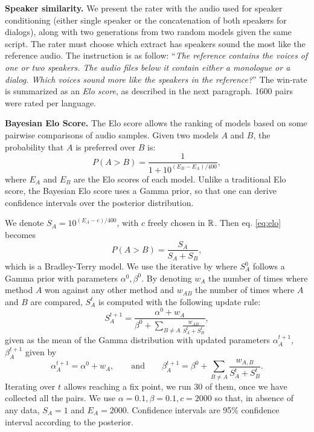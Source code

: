 \textbf{Speaker similarity.}
We present the rater with the audio used for speaker conditioning (either single speaker or the concatenation of both speakers for dialogs), along with two generations from two random models given the same script. The rater must choose which extract has speakers sound the most like the reference audio. The instruction is as follow:
``\emph{The reference contains the voices of one or two speakers. The audio files below it contain either a monologue or a dialog. Which voices sound more like the speakers in the reference?}''
The win-rate is summarized as an \emph{Elo score}, as described in the next paragraph. 1600 pairs were rated per language.

\textbf{Bayesian Elo Score.}
The Elo score allows the ranking of models based on some pairwise comparisons of audio samples. Given two models $A$ and $B$, the probability that $A$ is preferred over $B$ is:
\begin{equation}
    P(A>B) = \frac{1}{1 +10^{(E_B-E_A)/400}},
    \label{eq:elo}
\end{equation}
where $E_A$ and $E_B$ are the Elo scores of each model. 
Unlike a traditional Elo score, the Bayesian Elo score uses a Gamma prior,
so that one can derive confidence intervals over the posterior distribution.


We denote $S_A = 10^{(E_A - c)/400}$, with $c$ freely chosen in $\mathbb{R}$. Then eq. \eqref{eq:elo} becomes
\begin{equation}
    P(A>B) = \frac{S_A}{S_A+S_B},
\end{equation}
which is a Bradley-Terry \citep{bradley_terry} model. We use the iterative by \citet{carondoucet} where $S_A^0$ follows a Gamma prior with parameters $\alpha^0, \beta^0$. 
By denoting $w_A$ the number of times where method $A$ won against any other method and $w_{AB}$ the number of times where $A$ and $B$ are compared, $S_A^t$ is computed with the following update rule:
\begin{equation}
    S_A^{t+1} = \frac{\alpha^0 +w_A}{\beta^0 +\sum_{B \neq A}\frac{w_{AB}}{S_A^t+S_B^t}},
\end{equation}
given as the mean of the Gamma distribution with updated parameters $\alpha_A^{t + 1}$, $\beta_A^{t +1 }$ given by
\begin{equation}
    \alpha_A^{t+1} = \alpha^0 + w_A,\qquad
    \text{and}\qquad \beta_A^{t+1} = 
    \beta^0 + \sum_{B\neq A} \frac{w_{A,B}}{S_A^t + S_B^t}.
\end{equation}
Iterating over $t$ allows reaching a fix point, we run 30 of them,
once we have collected all the pairs.
We use $\alpha=0.1, \beta=0.1, c=2000$ so that, in absence of any data, $S_A=1$ and $E_A = 2000$. Confidence intervals are 95\% confidence interval according to the posterior.

